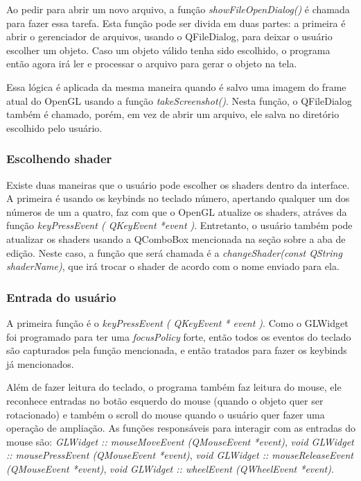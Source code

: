 Ao pedir para abrir um novo arquivo, a função \emph{showFileOpenDialog()} é chamada para fazer essa tarefa.
Esta função pode ser divida em duas partes: a primeira é abrir o gerenciador de arquivos, usando o 
QFileDialog, para deixar o usuário escolher um objeto. Caso um objeto válido tenha sido escolhido, 
o programa então agora irá ler e processar o arquivo para gerar o objeto na tela.

Essa lógica é aplicada da mesma maneira quando é salvo uma imagem do frame atual do OpenGL usando a 
função \emph{takeScreenshot()}. Nesta função, o QFileDialog também é chamado, porém, em vez de abrir um 
arquivo, ele salva no diretório escolhido pelo usuário.

\subsubsection{Escolhendo shader}

Existe duas maneiras que o usuário pode escolher os shaders dentro da interface. A primeira é usando 
os keybinds no teclado número, apertando qualquer um dos números de um a quatro, faz com que o 
OpenGL atualize os shaders, atráves da função \emph{keyPressEvent ( QKeyEvent *event )}. Entretanto, 
o usuário também pode atualizar os shaders usando a QComboBox mencionada na seção sobre a aba de edição.
Neste caso, a função que será chamada é a \emph{changeShader(const QString shaderName)}, que irá trocar 
o shader de acordo com o nome enviado para ela.

\subsubsection{Entrada do usuário}

A primeira função é o \emph{ keyPressEvent ( QKeyEvent * event )}. Como o GLWidget foi 
programado para ter uma \emph{focusPolicy} forte, então todos os eventos do teclado são capturados 
pela função mencionada, e então tratados para fazer os keybinds já mencionados.

Além de fazer leitura do teclado, o programa também faz leitura do mouse, ele 
reconhece entradas no botão esquerdo do mouse (quando o objeto quer ser rotacionado) e também o scroll do mouse 
quando o usuário quer fazer uma operação de ampliação. As funções responsáveis para interagir com as entradas do mouse
são: \emph{GLWidget :: mouseMoveEvent (QMouseEvent *event)}, \emph{void GLWidget :: mousePressEvent (QMouseEvent *event)},
\emph{void GLWidget :: mouseReleaseEvent (QMouseEvent *event)}, \emph{void GLWidget :: wheelEvent (QWheelEvent *event)}.


